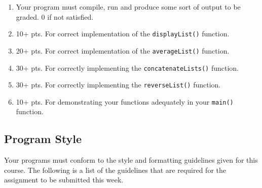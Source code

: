 \documentclass[11pt]{article}
\begin{document}
\begin{enumerate}
\item Your program must compile, run and produce some sort of output to
   be graded. 0 if not satisfied.
\item 10+ pts. For correct implementation of the \verb~displayList()~ function.
\item 20+ pts. For correct implementation of the \verb~averageList()~ function.
\item 30+ pts. For correctly implementing the \verb~concatenateLists()~ function.
\item 30+ pts. For correctly implementing the \verb~reverseList()~ function.
\item 10+ pts. For demonstrating your functions adequately in your \verb~main()~ function.
\end{enumerate}
\subsection*{Program Style}
\label{sec-5-2}


Your programs must conform to the style and formatting guidelines
given for this course.  The following is a list of the guidelines that
are required for the assignment to be submitted this week.
\end{document}
